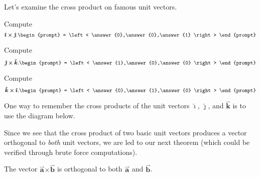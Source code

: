 \documentclass{ximera}
\begin{document}
Let's examine the cross product on famous unit vectors.
\begin{question}
  Compute
  \[
  \boldsymbol{\hat{\imath}} \boldsymbol\times \boldsymbol{\hat{\jmath}}.
  \begin{prompt}
    = \left< \answer{0},\answer{0},\answer{1} \right>
  \end{prompt}
  \]
  \begin{question}
  Compute
  \[
  \boldsymbol{\hat{\jmath}} \boldsymbol\times \boldsymbol{\hat{k}}. 
  \begin{prompt}
    = \left< \answer{1},\answer{0},\answer{0} \right>
  \end{prompt}
  \]
  \begin{question}
  Compute
  \[
  \boldsymbol{\hat{k}} \boldsymbol\times \boldsymbol{\hat{\imath}}. 
  \begin{prompt}
    = \left< \answer{0},\answer{1},\answer{0} \right>
  \end{prompt}
  \]
\end{question}
\end{question}
\end{question}


One way to remember the cross products of the unit vectors $\boldsymbol{\hat{\imath}}$, $\boldsymbol{\hat{\jmath}}$, and $\boldsymbol{\hat{k}}$ is to use the diagram below.
\begin{image}[1in]
\end{image}

Since we see that the cross product of two basic unit vectors produces
a vector orthogonal to \textit{both} unit vectors, we are led to our
next theorem (which could be verified through brute force
computations).

\begin{theorem}
  The vector $\overset{\boldsymbol{\rightharpoonup}}{\mathbf{a}} \boldsymbol\times \overset{\boldsymbol{\rightharpoonup}}{\mathbf{b}}$ is orthogonal to both $\overset{\boldsymbol{\rightharpoonup}}{\mathbf{a}}$
  and $\overset{\boldsymbol{\rightharpoonup}}{\mathbf{b}}$.
\end{theorem}
\end{document}
